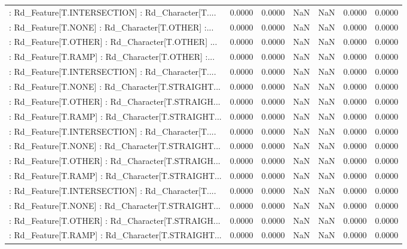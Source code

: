 \begin{longtable}{p{4cm}cccccc}
 : Rd\_Feature[T.INTERSECTION] : Rd\_Character[T.... &  0.0000 &    0.0000 &     NaN &          NaN &  0.0000 &  0.0000 \\
 : Rd\_Feature[T.NONE] : Rd\_Character[T.OTHER] :... &  0.0000 &    0.0000 &     NaN &          NaN &  0.0000 &  0.0000 \\
 : Rd\_Feature[T.OTHER] : Rd\_Character[T.OTHER] ... &  0.0000 &    0.0000 &     NaN &          NaN &  0.0000 &  0.0000 \\
 : Rd\_Feature[T.RAMP] : Rd\_Character[T.OTHER] :... &  0.0000 &    0.0000 &     NaN &          NaN &  0.0000 &  0.0000 \\
 : Rd\_Feature[T.INTERSECTION] : Rd\_Character[T.... &  0.0000 &    0.0000 &     NaN &          NaN &  0.0000 &  0.0000 \\
 : Rd\_Feature[T.NONE] : Rd\_Character[T.STRAIGHT... &  0.0000 &    0.0000 &     NaN &          NaN &  0.0000 &  0.0000 \\
 : Rd\_Feature[T.OTHER] : Rd\_Character[T.STRAIGH... &  0.0000 &    0.0000 &     NaN &          NaN &  0.0000 &  0.0000 \\
 : Rd\_Feature[T.RAMP] : Rd\_Character[T.STRAIGHT... &  0.0000 &    0.0000 &     NaN &          NaN &  0.0000 &  0.0000 \\
 : Rd\_Feature[T.INTERSECTION] : Rd\_Character[T.... &  0.0000 &    0.0000 &     NaN &          NaN &  0.0000 &  0.0000 \\
 : Rd\_Feature[T.NONE] : Rd\_Character[T.STRAIGHT... &  0.0000 &    0.0000 &     NaN &          NaN &  0.0000 &  0.0000 \\
 : Rd\_Feature[T.OTHER] : Rd\_Character[T.STRAIGH... &  0.0000 &    0.0000 &     NaN &          NaN &  0.0000 &  0.0000 \\
 : Rd\_Feature[T.RAMP] : Rd\_Character[T.STRAIGHT... &  0.0000 &    0.0000 &     NaN &          NaN &  0.0000 &  0.0000 \\
 : Rd\_Feature[T.INTERSECTION] : Rd\_Character[T.... &  0.0000 &    0.0000 &     NaN &          NaN &  0.0000 &  0.0000 \\
 : Rd\_Feature[T.NONE] : Rd\_Character[T.STRAIGHT... &  0.0000 &    0.0000 &     NaN &          NaN &  0.0000 &  0.0000 \\
 : Rd\_Feature[T.OTHER] : Rd\_Character[T.STRAIGH... &  0.0000 &    0.0000 &     NaN &          NaN &  0.0000 &  0.0000 \\
 : Rd\_Feature[T.RAMP] : Rd\_Character[T.STRAIGHT... &  0.0000 &    0.0000 &     NaN &          NaN &  0.0000 &  0.0000 \\

\end{longtable}
